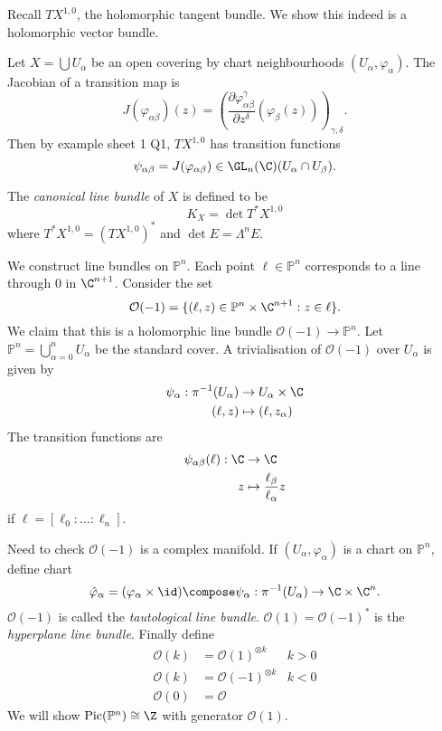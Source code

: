 \documentclass[a4paper]{article}
\renewcommand{\P}{\mathbb P} %
\DeclareMathOperator{\Pic}{Pic} %
\begin{document}
\begin{eg}
  Recall \(TX^{1, 0}\), the holomorphic tangent bundle. We show this indeed is a holomorphic vector bundle.

  Let \(X = \bigcup U_\alpha\) be an open covering by chart neighbourhoods \((U_\alpha, \varphi_\alpha)\). The Jacobian of a transition map is
  \[
    J(\varphi_{\alpha\beta})(z) = \left( \frac{\partial \varphi_{\alpha\beta}^\gamma}{\partial z^\delta} (\varphi_\beta(z)) \right)_{\gamma, \delta}.
  \]
  Then by example sheet 1 Q1, \(TX^{1, 0}\) has transition functions
  \[
    \psi_{\alpha\beta} = J(\varphi_{\alpha\beta}) \in \GL_n(\C) (U_\alpha \cap U_\beta).
  \]

  \begin{definition}
    The \emph{canonical line bundle} of \(X\) is defined to be
    \[
      K_X = \det T^*X^{1, 0}
    \]
    where \(T^*X^{1, 0} = (TX^{1, 0})^*\) and \(\det E = \Lambda^n E\).
\end{definition}
\end{eg}

\begin{eg}
  We construct line bundles on \(\P^n\). Each point \(\ell \in \P^n\) corresponds to a line through \(0\) in \(\C^{n + 1}\). Consider the set
  \[
    \mathcal O(-1) = \{(\ell, z) \in \P^n \times \C^{n + 1}: z \in \ell\}.
  \]
  We claim that this is a holomorphic line bundle \(\mathcal O(-1) \to \P^n\). Let \(\P^n = \bigcup_{\alpha = 0}^n U_\alpha\) be the standard cover. A trivialisation of \(\mathcal O(-1)\) over \(U_\alpha\) is given by
  \begin{align*}
    \psi_\alpha: \pi^{-1}(U_\alpha) &\to U_\alpha \times \C \\
    (\ell, z) &\mapsto (\ell, z_\alpha)
  \end{align*}
  The transition functions are
  \begin{align*}
    \psi_{\alpha\beta}(\ell): \C &\to \C \\
    z &\mapsto \frac{\ell_\beta}{\ell_\alpha} z
  \end{align*}
  if \(\ell = [\ell_0 : \dots : \ell_n]\).

  Need to check \(\mathcal O(-1)\) is a complex manifold. If \((U_\alpha, \varphi_\alpha)\) is a chart on \(\P^n\), define chart
  \[
    \hat \varphi_\alpha = (\varphi_\alpha \times \id) \compose \psi_\alpha: \pi^{-1}(U_\alpha) \to \C \times \C^n.
  \]
  \(\mathcal O(-1)\) is called the \emph{tautological line bundle}. \(\mathcal O(1) = \mathcal O(-1)^*\) is the \emph{hyperplane line bundle}. Finally define
  \begin{align*}
    \mathcal O(k) &= \mathcal O(1)^{\otimes k} & k > 0 \\
    \mathcal O(k) &= \mathcal O(-1)^{\otimes k} & k < 0 \\
    \mathcal O(0) &= \mathcal O
  \end{align*}
  We will show \(\Pic(\P^n) \cong \Z\) with generator \(\mathcal O(1)\).
\end{eg}
\end{document}
